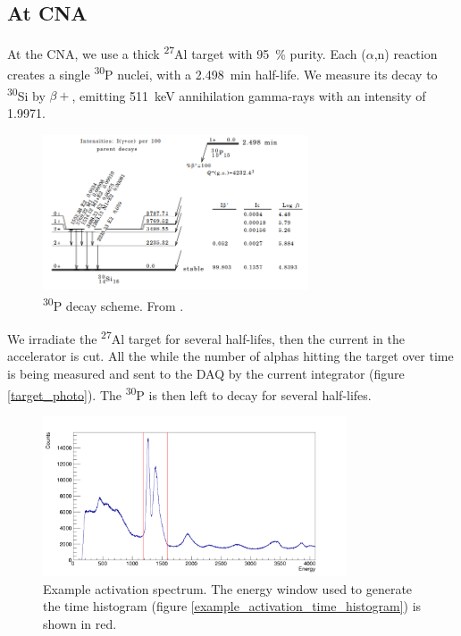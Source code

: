 \documentclass[a4paper,12pt]{report}
\newcommand{\an}{($\alpha$,n) }
\newcommand{\Aliso}{\textsuperscript{27}Al }
\newcommand{\Piso}{\textsuperscript{30}P }
\begin{document}
\subsection{At CNA}
At the CNA, we use a thick \Aliso target with \qty{95}{\percent} purity.
Each \an reaction creates a single \Piso nuclei, with a \qty{2.498}{\minute} half-life.
We measure its decay to \textsuperscript{30}Si by $\beta +$, emitting \qty{511}{\keV} annihilation gamma-rays with an intensity of \num{1.9971}.\cite{nucleardatasheets}

\begin{figure}[H]
	\centering
	\includegraphics[width=0.7\textwidth]{Piso_decay_scheme.png}
	\caption{\Piso decay scheme.
	From \cite{nucleardatasheets}.}
	\label{Piso_decay_scheme}
\end{figure}

We irradiate the \Aliso target for several half-lifes, then the current in the accelerator is cut.
All the while the number of alphas hitting the target over time is being measured and sent to the DAQ by the current integrator (figure \ref{target_photo}).
The \Piso is then left to decay for several half-lifes.

\begin{figure}[H]
	\centering
	\includegraphics[width=0.80\textwidth]{example_activation_energy_histogram.png}
	\caption{Example activation spectrum.
	The energy window used to generate the time histogram (figure \ref{example_activation_time_histogram}) is shown in red.}
	\label{example_activation_energy_histogram}
\end{figure}
\end{document}
